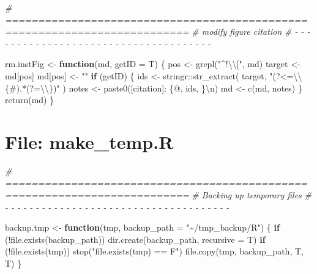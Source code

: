 \documentclass[
]{article}
\newenvironment{Shaded}{\begin{snugshade}}{\end{snugshade}}
\newcommand{\AttributeTok}[1]{\textcolor[rgb]{0.77,0.63,0.00}{#1}}
\newcommand{\CommentTok}[1]{\textcolor[rgb]{0.56,0.35,0.01}{\textit{#1}}}
\newcommand{\ControlFlowTok}[1]{\textcolor[rgb]{0.13,0.29,0.53}{\textbf{#1}}}
\newcommand{\FunctionTok}[1]{\textcolor[rgb]{0.00,0.00,0.00}{#1}}
\newcommand{\NormalTok}[1]{#1}
\newcommand{\OtherTok}[1]{\textcolor[rgb]{0.56,0.35,0.01}{#1}}
\newcommand{\SpecialCharTok}[1]{\textcolor[rgb]{0.00,0.00,0.00}{#1}}
\newcommand{\StringTok}[1]{\textcolor[rgb]{0.31,0.60,0.02}{#1}}
\begin{document}
\begin{Shaded}
\begin{Highlighting}[]
\CommentTok{\# ==========================================================================}
\CommentTok{\# modify figure citation}
\CommentTok{\# {-} {-} {-} {-} {-} {-} {-} {-} {-} {-} {-} {-} {-} {-} {-} {-} {-} {-} {-} {-} {-} {-} {-} {-} {-} {-} {-} {-} {-} {-} {-} {-} {-} {-} {-} {-} {-}}

\NormalTok{rm.instFig }\OtherTok{\textless{}{-}} \ControlFlowTok{function}\NormalTok{(md, }\AttributeTok{getID =}\NormalTok{ T) \{}
\NormalTok{  pos }\OtherTok{\textless{}{-}} \FunctionTok{grepl}\NormalTok{(}\StringTok{"\^{}!}\SpecialCharTok{\textbackslash{}\textbackslash{}}\StringTok{["}\NormalTok{, md)}
\NormalTok{  target }\OtherTok{\textless{}{-}}\NormalTok{ md[pos]}
\NormalTok{  md[pos] }\OtherTok{\textless{}{-}} \StringTok{""}
  \ControlFlowTok{if}\NormalTok{ (getID) \{}
\NormalTok{    ids }\OtherTok{\textless{}{-}}\NormalTok{ stringr}\SpecialCharTok{::}\FunctionTok{str\_extract}\NormalTok{(}
\NormalTok{      target, }\StringTok{"(?\textless{}=}\SpecialCharTok{\textbackslash{}\textbackslash{}}\StringTok{\{\#).*(?=}\SpecialCharTok{\textbackslash{}\textbackslash{}}\StringTok{\})"}
\NormalTok{    )}
\NormalTok{    notes }\OtherTok{\textless{}{-}} \FunctionTok{paste0}\NormalTok{(}\StringTok{\textquotesingle{}[citation]: \{@\textquotesingle{}}\NormalTok{, ids, }\StringTok{\textquotesingle{}\}}\SpecialCharTok{\textbackslash{}n}\StringTok{\textquotesingle{}}\NormalTok{)}
\NormalTok{    md }\OtherTok{\textless{}{-}} \FunctionTok{c}\NormalTok{(md, notes)}
\NormalTok{  \}}
  \FunctionTok{return}\NormalTok{(md)}
\NormalTok{\}}
\end{Highlighting}
\end{Shaded}

\hypertarget{file-make_temp.r}{%
\section{File: make\_temp.R}\label{file-make_temp.r}}

\begin{Shaded}
\begin{Highlighting}[]
\CommentTok{\# ==========================================================================}
\CommentTok{\# Backing up temporary files}
\CommentTok{\# {-} {-} {-} {-} {-} {-} {-} {-} {-} {-} {-} {-} {-} {-} {-} {-} {-} {-} {-} {-} {-} {-} {-} {-} {-} {-} {-} {-} {-} {-} {-} {-} {-} {-} {-} {-} {-}}

\NormalTok{backup.tmp }\OtherTok{\textless{}{-}} \ControlFlowTok{function}\NormalTok{(tmp, }\AttributeTok{backup\_path =} \StringTok{"\textasciitilde{}/tmp\_backup/R"}\NormalTok{) \{}
  \ControlFlowTok{if}\NormalTok{ (}\SpecialCharTok{!}\FunctionTok{file.exists}\NormalTok{(backup\_path))}
    \FunctionTok{dir.create}\NormalTok{(backup\_path, }\AttributeTok{recursive =}\NormalTok{ T)}
  \ControlFlowTok{if}\NormalTok{ (}\SpecialCharTok{!}\FunctionTok{file.exists}\NormalTok{(tmp))}
    \FunctionTok{stop}\NormalTok{(}\StringTok{"file.exists(tmp) == F"}\NormalTok{)}
  \FunctionTok{file.copy}\NormalTok{(tmp, backup\_path, T, T)}
\NormalTok{\}}
\end{Highlighting}
\end{Shaded}
\end{document}

